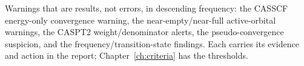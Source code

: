 Warnings that are results, not errors, in descending frequency: the CASSCF
energy-only convergence warning, the near-empty/near-full active-orbital
warnings, the CASPT2 weight/denominator alerts, the pseudo-convergence
suspicion, and the frequency/transition-state findings. Each carries its
evidence and action in the report; Chapter~\ref{ch:criteria} has the
thresholds.
